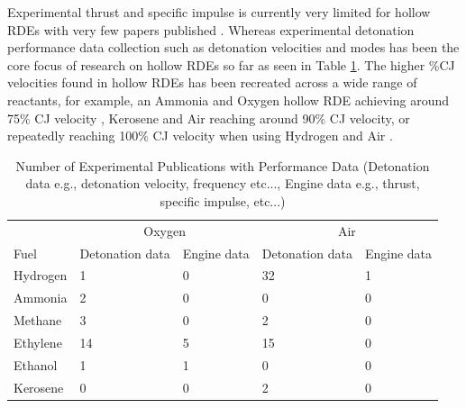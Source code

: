 \documentclass{article}
\begin{document}
Experimental thrust and specific impulse is currently very limited for hollow RDEs with very few papers published \cite{Yokoo2020,Goto2022,Nakata2022,Yokoo2021,Ishihara2023,1ISHIHARA2023,Lin2020}. Whereas experimental detonation performance data collection such as detonation velocities and modes has been the core focus of research on hollow RDEs so far as seen in Table \ref{table1}. The higher \%CJ velocities found in hollow RDEs has been recreated across a wide range of reactants, for example, an Ammonia and Oxygen hollow RDE achieving around 75\% CJ velocity  \cite{Huang2022}, Kerosene and Air reaching around 90\% CJ velocity\cite{Xue2022}, or repeatedly reaching 100\% CJ velocity when using Hydrogen and Air \cite{Wang2019}.
\par
\begin{table}
	\caption{Number of Experimental Publications with Performance Data (Detonation data e.g., detonation velocity, frequency etc..., Engine data e.g., thrust, specific impulse, etc...)}
	\centering
	\begin{tabular}{lllll}
		\toprule
		\multirow{1}{*}{} & \multicolumn{2}{c}{Oxygen} & \multicolumn{2}{c}{Air} \\
		\cmidrule(r){2-5}
		Fuel     & Detonation data    & Engine data & Detonation data & Engine data\\
		\midrule
		Hydrogen    & \cellcolor[HTML]{FFCAD4} 1 & \cellcolor[HTML]{F4ACB7} 0 & \cellcolor[HTML]{D8E2DC} 32 & \cellcolor[HTML]{FFCAD4} 1 \\
		Ammonia     & \cellcolor[HTML]{FFCAD4} 2 & \cellcolor[HTML]{F4ACB7} 0 & \cellcolor[HTML]{F4ACB7} 0 & \cellcolor[HTML]{F4ACB7} 0 \\
		Methane     & \cellcolor[HTML]{FFCAD4} 3 & \cellcolor[HTML]{F4ACB7} 0 & \cellcolor[HTML]{FFCAD4} 2 & \cellcolor[HTML]{F4ACB7} 0 \\
        Ethylene    & \cellcolor[HTML]{D8E2DC} 14 & \cellcolor[HTML]{FFE5D9} 5 & \cellcolor[HTML]{D8E2DC} 15 & \cellcolor[HTML]{F4ACB7} 0 \\
        Ethanol     & \cellcolor[HTML]{FFCAD4} 1 & \cellcolor[HTML]{FFCAD4} 1 & \cellcolor[HTML]{F4ACB7} 0 & \cellcolor[HTML]{F4ACB7} 0 \\
        Kerosene    & \cellcolor[HTML]{F4ACB7} 0 & \cellcolor[HTML]{F4ACB7} 0 & \cellcolor[HTML]{FFCAD4} 2 & \cellcolor[HTML]{F4ACB7} 0 \\
		\bottomrule
	\end{tabular}
	\label{table1}
\end{table}
\end{document}
